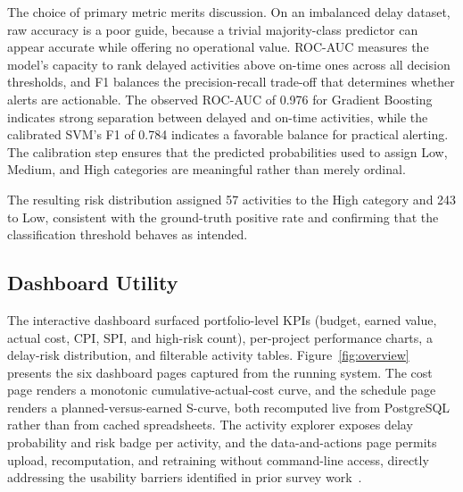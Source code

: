 \documentclass[conference]{IEEEtran}
\begin{document}
The choice of primary metric merits discussion. On an imbalanced delay dataset, raw accuracy is a poor guide, because a trivial majority-class predictor can appear accurate while offering no operational value. ROC-AUC measures the model's capacity to rank delayed activities above on-time ones across all decision thresholds, and F1 balances the precision-recall trade-off that determines whether alerts are actionable. The observed ROC-AUC of 0.976 for Gradient Boosting indicates strong separation between delayed and on-time activities, while the calibrated SVM's F1 of 0.784 indicates a favorable balance for practical alerting. The calibration step ensures that the predicted probabilities used to assign Low, Medium, and High categories are meaningful rather than merely ordinal.

The resulting risk distribution assigned 57 activities to the High category and 243 to Low, consistent with the ground-truth positive rate and confirming that the classification threshold behaves as intended.

\subsection{Dashboard Utility}

The interactive dashboard surfaced portfolio-level KPIs (budget, earned value, actual cost, CPI, SPI, and high-risk count), per-project performance charts, a delay-risk distribution, and filterable activity tables. Figure~\ref{fig:overview} presents the six dashboard pages captured from the running system. The cost page renders a monotonic cumulative-actual-cost curve, and the schedule page renders a planned-versus-earned S-curve, both recomputed live from PostgreSQL rather than from cached spreadsheets. The activity explorer exposes delay probability and risk badge per activity, and the data-and-actions page permits upload, recomputation, and retraining without command-line access, directly addressing the usability barriers identified in prior survey work~\cite{ghosh2024use}.
\end{document}
